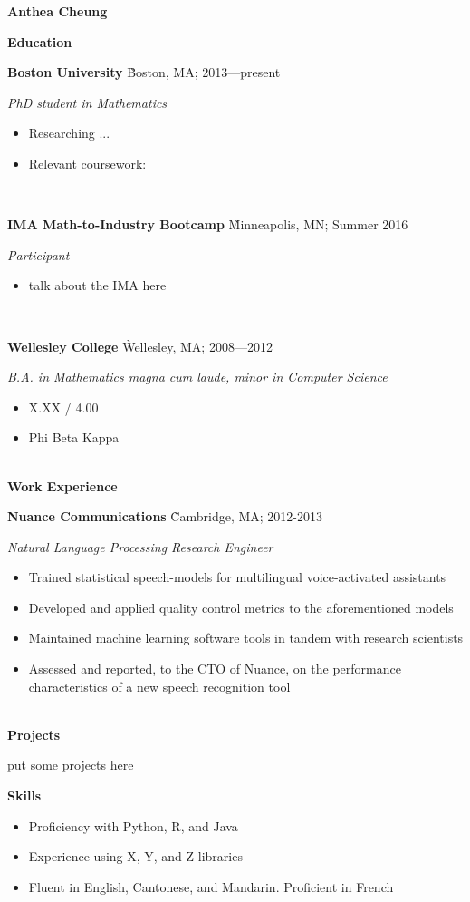 \documentclass[letter, 11pt]{article}
\newcommand{\job}[5]{
  \parbox[l]{\textwidth}{

    \begin{tabbing} {\large \bf #1} \` {\small #2; #3} \end{tabbing}
    \textit{#4}

    \begin{itemize}
      #5
    \end{itemize}
  }
  \vspace{0.4cm}\\
}
\newcommand{\heading}[1]{\Large \textbf{#1} \vspace{0.4cm}}
\begin{document}
\textheight=11in
\flushleft

{\LARGE \textbf{Anthea Cheung}}

\vspace{1.0cm}

\heading{Education}


\job{Boston University}
    {Boston, MA}
    {2013---present}
    {PhD student in Mathematics}{
    \item Researching ...
    \item Relevant coursework:
}


\job{IMA Math-to-Industry Bootcamp}
    {Minneapolis, MN}
    {Summer 2016}
    {Participant}
    {
\item talk about the IMA here
}

\job{Wellesley College}
    {Wellesley, MA}
    {2008---2012}
    {B.A. in Mathematics \textit{magna cum laude}, minor in Computer Science}{
    \item X.XX / 4.00
    \item Phi Beta Kappa
}

\heading{Work Experience}

\job{Nuance Communications}
    {Cambridge, MA}
    {2012-2013}
    {Natural Language Processing Research Engineer}{
    \item Trained statistical speech-models for multilingual voice-activated
      assistants
    \item Developed and applied quality control metrics to the aforementioned
      models
    \item Maintained machine learning software tools in tandem with research
      scientists
    \item Assessed and reported, to the CTO of Nuance, on the performance
      characteristics of a new speech recognition tool
    }

\heading{Projects}

put some projects here

\heading{Skills}

\begin{itemize}
\item Proficiency with Python, R, and Java
\item Experience using X, Y, and Z libraries
\item Fluent in English, Cantonese, and Mandarin. Proficient in French
\end{itemize}
\end{document}

